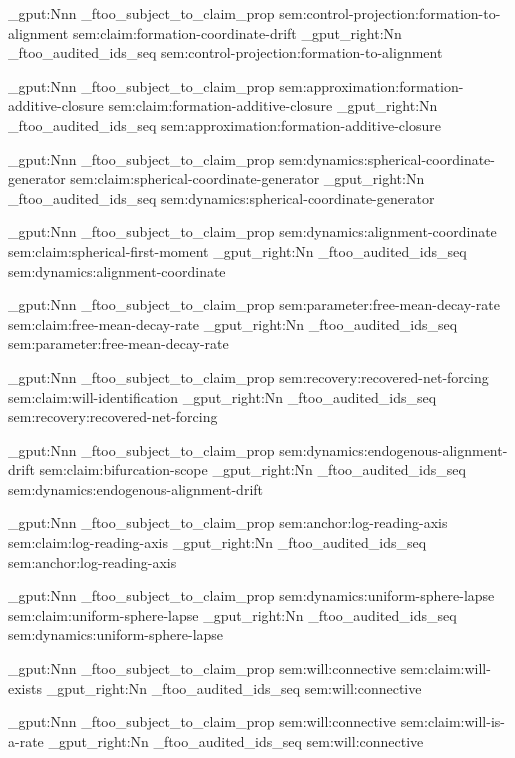 \prop_gput:Nnn \g_ftoo_subject_to_claim_prop { sem:control-projection:formation-to-alignment } { sem:claim:formation-coordinate-drift }
\seq_gput_right:Nn \g_ftoo_audited_ids_seq { sem:control-projection:formation-to-alignment }

\prop_gput:Nnn \g_ftoo_subject_to_claim_prop { sem:approximation:formation-additive-closure } { sem:claim:formation-additive-closure }
\seq_gput_right:Nn \g_ftoo_audited_ids_seq { sem:approximation:formation-additive-closure }

\prop_gput:Nnn \g_ftoo_subject_to_claim_prop { sem:dynamics:spherical-coordinate-generator } { sem:claim:spherical-coordinate-generator }
\seq_gput_right:Nn \g_ftoo_audited_ids_seq { sem:dynamics:spherical-coordinate-generator }

\prop_gput:Nnn \g_ftoo_subject_to_claim_prop { sem:dynamics:alignment-coordinate } { sem:claim:spherical-first-moment }
\seq_gput_right:Nn \g_ftoo_audited_ids_seq { sem:dynamics:alignment-coordinate }

\prop_gput:Nnn \g_ftoo_subject_to_claim_prop { sem:parameter:free-mean-decay-rate } { sem:claim:free-mean-decay-rate }
\seq_gput_right:Nn \g_ftoo_audited_ids_seq { sem:parameter:free-mean-decay-rate }

\prop_gput:Nnn \g_ftoo_subject_to_claim_prop { sem:recovery:recovered-net-forcing } { sem:claim:will-identification }
\seq_gput_right:Nn \g_ftoo_audited_ids_seq { sem:recovery:recovered-net-forcing }

\prop_gput:Nnn \g_ftoo_subject_to_claim_prop { sem:dynamics:endogenous-alignment-drift } { sem:claim:bifurcation-scope }
\seq_gput_right:Nn \g_ftoo_audited_ids_seq { sem:dynamics:endogenous-alignment-drift }

\prop_gput:Nnn \g_ftoo_subject_to_claim_prop { sem:anchor:log-reading-axis } { sem:claim:log-reading-axis }
\seq_gput_right:Nn \g_ftoo_audited_ids_seq { sem:anchor:log-reading-axis }

\prop_gput:Nnn \g_ftoo_subject_to_claim_prop { sem:dynamics:uniform-sphere-lapse } { sem:claim:uniform-sphere-lapse }
\seq_gput_right:Nn \g_ftoo_audited_ids_seq { sem:dynamics:uniform-sphere-lapse }

\prop_gput:Nnn \g_ftoo_subject_to_claim_prop { sem:will:connective } { sem:claim:will-exists }
\seq_gput_right:Nn \g_ftoo_audited_ids_seq { sem:will:connective }

\prop_gput:Nnn \g_ftoo_subject_to_claim_prop { sem:will:connective } { sem:claim:will-is-a-rate }
\seq_gput_right:Nn \g_ftoo_audited_ids_seq { sem:will:connective }

